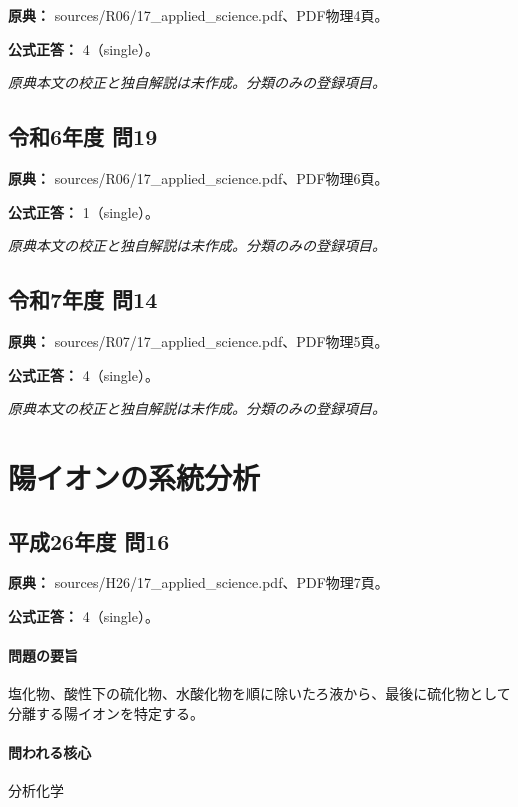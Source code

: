\noindent\textbf{原典：} sources/R06/17\_applied\_science.pdf、PDF物理4頁。

\textbf{公式正答：} 4（single）。

\par\textit{原典本文の校正と独自解説は未作成。分類のみの登録項目。}

\subsection{令和6年度 問19}
\label{q:r06-reg-applied-19}

\noindent\textbf{原典：} sources/R06/17\_applied\_science.pdf、PDF物理6頁。

\textbf{公式正答：} 1（single）。

\par\textit{原典本文の校正と独自解説は未作成。分類のみの登録項目。}

\subsection{令和7年度 問14}
\label{q:r07-reg-applied-14}

\noindent\textbf{原典：} sources/R07/17\_applied\_science.pdf、PDF物理5頁。

\textbf{公式正答：} 4（single）。

\par\textit{原典本文の校正と独自解説は未作成。分類のみの登録項目。}

\section{陽イオンの系統分析}

\subsection{平成26年度 問16}
\label{q:h26-reg-applied-16}

\noindent\textbf{原典：} sources/H26/17\_applied\_science.pdf、PDF物理7頁。

\textbf{公式正答：} 4（single）。

\paragraph{問題の要旨} 塩化物、酸性下の硫化物、水酸化物を順に除いたろ液から、最後に硫化物として分離する陽イオンを特定する。

\paragraph{問われる核心} 分析化学

